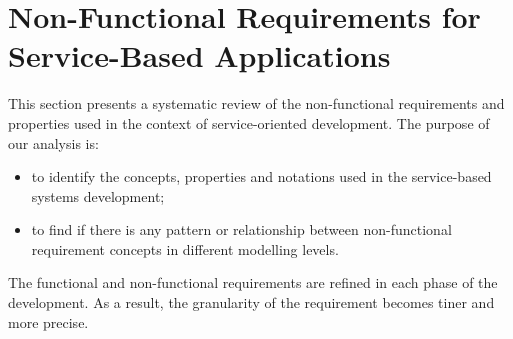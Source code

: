 \section{Non-Functional Requirements for Service-Based Applications}   
\label{sec:nfrs}   

This section presents a systematic review of the non-func\-tion\-al
requirements and properties used in the context of service-oriented
development. The purpose of our analysis is:
\begin{itemize}
  \item to identify the concepts, properties and notations used in the
  service-based systems development;
  \item to find if there is any pattern or relationship between non-functional
requirement concepts in different modelling levels.
\end{itemize}

The functional and non-functional requirements are refined in each phase of the
development. As a result, the granularity of the requirement becomes tiner and
more precise.









